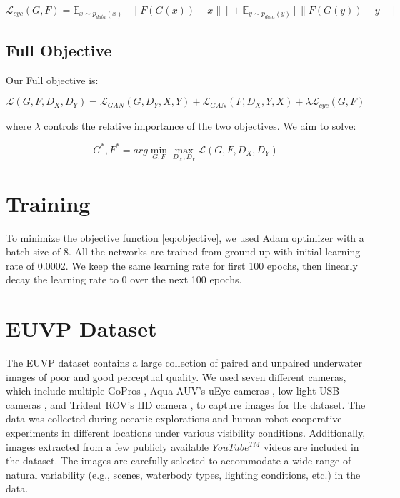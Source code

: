 \documentclass[a4paper]{article}
\begin{document}
\begin{equation}
    \label{eq:cycloss}
    \mathcal{L}_{cyc}(G, F) = \mathbb{E}_{x\sim p_{data}(x)}[\left \|F(G(x)) - x\right \|] + \mathbb{E}_{y\sim p_{data}(y)}[\left \|F(G(y)) - y\right \|]
\end{equation}

\subsection{Full Objective}
Our Full objective is:

\begin{equation}
    \label{eq:full_loss}
    \mathcal{L}(G, F, D_X, D_Y) = \mathcal{L}_{GAN}(G, D_Y, X, Y) + \mathcal{L}_{GAN}(F, D_X, Y, X) + \lambda \mathcal{L}_{cyc}(G, F)
\end{equation}

where $\lambda$ controls the relative importance of the two objectives.
We aim to solve:

\begin{equation}
    \label{eq:objective}
    G^*, F^* = arg \min_{G, F} \max_{D_X, D_Y} \mathcal{L}(G, F, D_X, D_Y)
\end{equation}

\section{Training}
To minimize the objective function \ref{eq:objective}, we used Adam optimizer \cite{kingma2017adam} with a batch size of 8. All the networks are trained from ground up with initial learning rate of 0.0002. We keep the same learning rate for first 100 epochs, then linearly decay the learning rate to 0 over the next 100 epochs.

\section{EUVP Dataset}
The EUVP dataset contains a large collection of paired and unpaired underwater images of poor and good perceptual quality. We used seven different cameras, which include multiple GoPros \cite{gopro}, Aqua AUV’s uEye cameras \cite{uEye-cameras}, low-light USB cameras \cite{blue-robotics}, and Trident ROV’s HD camera  \cite{openrov}, to capture images for the dataset. The data was collected during oceanic explorations and human-robot cooperative experiments in different locations under various visibility conditions. Additionally, images extracted from a few publicly available $YouTube^{TM}$ videos are included in the dataset. The images are carefully selected to accommodate a wide range of natural variability (e.g., scenes, waterbody types, lighting conditions, etc.) in the data.
\end{document}
